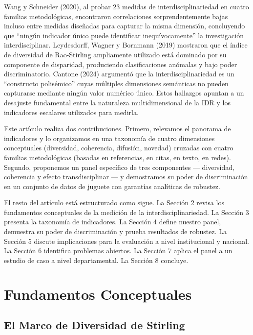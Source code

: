 \documentclass[
]{article}
\begin{document}
Wang y Schneider (2020), al probar 23 medidas de interdisciplinariedad
en cuatro familias metodológicas, encontraron correlaciones
sorprendentemente bajas incluso entre medidas diseñadas para capturar la
misma dimensión, concluyendo que ``ningún indicador único puede
identificar inequívocamente'' la investigación interdisciplinar.
Leydesdorff, Wagner y Bornmann (2019) mostraron que el índice de
diversidad de Rao-Stirling ampliamente utilizado está dominado por su
componente de disparidad, produciendo clasificaciones anómalas y bajo
poder discriminatorio. Cantone (2024) argumentó que la
interdisciplinariedad es un ``constructo polisémico'' cuyas múltiples
dimensiones semánticas no pueden capturarse mediante ningún valor
numérico único. Estos hallazgos apuntan a un desajuste fundamental entre
la naturaleza multidimensional de la IDR y los indicadores escalares
utilizados para medirla.

Este artículo realiza dos contribuciones. Primero, relevamos el panorama
de indicadores y lo organizamos en una taxonomía de cuatro dimensiones
conceptuales (diversidad, coherencia, difusión, novedad) cruzadas con
cuatro familias metodológicas (basadas en referencias, en citas, en
texto, en redes). Segundo, proponemos un panel específico de tres
componentes --- diversidad, coherencia y efecto transdisciplinar --- y
demostramos su poder de discriminación en un conjunto de datos de
juguete con garantías analíticas de robustez.

El resto del artículo está estructurado como sigue. La Sección 2 revisa
los fundamentos conceptuales de la medición de la interdisciplinariedad.
La Sección 3 presenta la taxonomía de indicadores. La Sección 4 define
nuestro panel, demuestra su poder de discriminación y prueba resultados
de robustez. La Sección 5 discute implicaciones para la evaluación a
nivel institucional y nacional. La Sección 6 identifica problemas
abiertos. La Sección 7 aplica el panel a un estudio de caso a nivel
departamental. La Sección 8 concluye.

\hypertarget{fundamentos-conceptuales}{%
\section{Fundamentos Conceptuales}\label{fundamentos-conceptuales}}

\hypertarget{el-marco-de-diversidad-de-stirling}{%
\subsection{El Marco de Diversidad de
Stirling}\label{el-marco-de-diversidad-de-stirling}}
\end{document}
